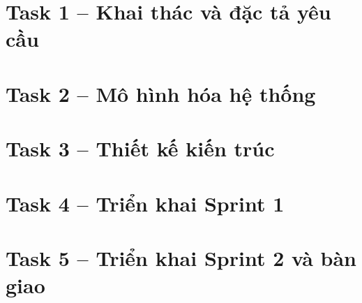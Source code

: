 \documentclass[12pt,a4paper]{article}
\begin{document}
\tableofcontents
\clearpage

\clearpage

\section{Task 1 -- Khai thác và đặc tả yêu cầu}




\section{Task 2 -- Mô hình hóa hệ thống}




\section{Task 3 -- Thiết kế kiến trúc}



\section{Task 4 -- Triển khai Sprint 1}





\section{Task 5 -- Triển khai Sprint 2 và bàn giao}




\end{document}
